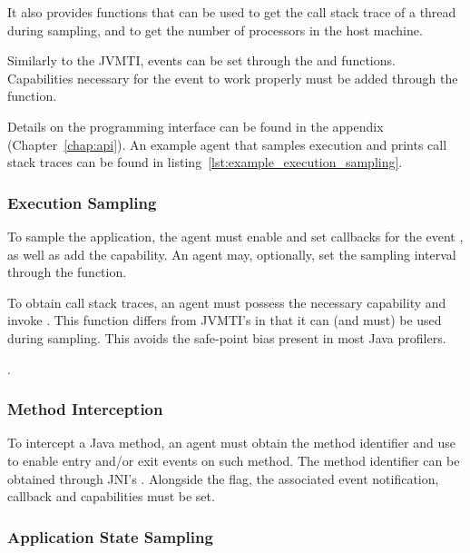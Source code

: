 It also provides functions that can be used to get the call stack trace of a thread during sampling, and to get the number of processors in the host machine.

Similarly to the JVMTI, events can be set through the  and  functions. Capabilities necessary for the event to work properly must be added through the  function.

Details on the programming interface can be found in the appendix (Chapter~\ref{chap:api}). An example agent that samples execution and prints call stack traces can be found in listing~\ref{lst:example_execution_sampling}.

\subsubsection*{Execution Sampling}

To sample the application, the agent must enable and set callbacks for the event , as well as add the  capability. An agent may, optionally, set the sampling interval through the  function.


To obtain call stack traces, an agent must possess the necessary capability and invoke . This function differs from JVMTI's  in that it can (and must) be used during sampling. This avoids the safe-point bias present in most Java profilers.


.

\subsubsection*{Method Interception}

To intercept a Java method, an agent must obtain the method identifier and use  to enable entry and/or exit events on such method. The method identifier can be obtained through JNI's . Alongside the flag, the associated event notification, callback and capabilities must be set.

\subsubsection*{Application State Sampling}

